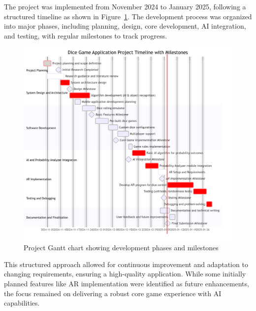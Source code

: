The project was implemented from November 2024 to January 2025, following a structured timeline as shown in Figure~\ref{fig:gantt}. The development process was organized into major phases, including planning, design, core development, AI integration, and testing, with regular milestones to track progress.

\begin{figure}[h]
    \centering
    \includegraphics[width=\textwidth]{img/gantt_chart.png}
    \caption{Project Gantt chart showing development phases and milestones}
    \label{fig:gantt}
\end{figure}

This structured approach allowed for continuous improvement and adaptation to changing requirements, ensuring a high-quality application. While some initially planned features like AR implementation were identified as future enhancements, the focus remained on delivering a robust core game experience with AI capabilities.
